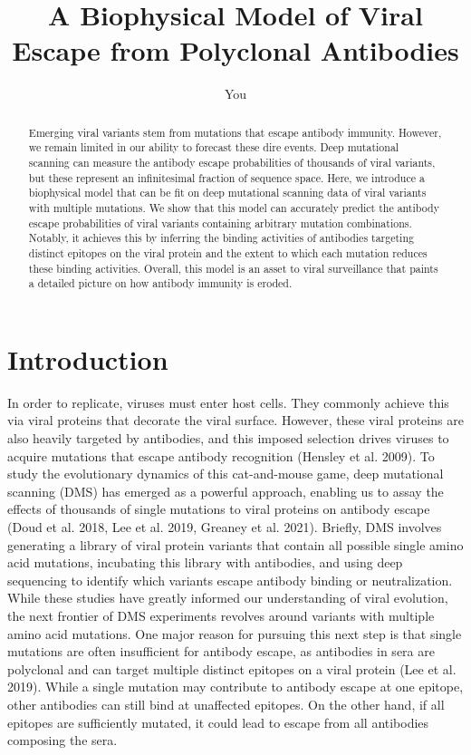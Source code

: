 \documentclass{article}
\title{A Biophysical Model of Viral Escape from Polyclonal Antibodies}
\author{You}
\begin{document}
\maketitle

\begin{abstract}
Emerging viral variants stem from mutations that escape antibody immunity. 
However, we remain limited in our ability to forecast these dire events. 
Deep mutational scanning can measure the antibody escape probabilities of thousands of viral variants, but these represent an infinitesimal fraction of sequence space.
Here, we introduce a biophysical model that can be fit on deep mutational scanning data of viral variants with multiple mutations. 
We show that this model can accurately predict the antibody escape probabilities of viral variants containing arbitrary mutation combinations.
Notably, it achieves this by inferring the binding activities of antibodies targeting distinct epitopes on the viral protein and the extent to which each mutation reduces these binding activities. 
Overall, this model is an asset to viral surveillance that paints a detailed picture on how antibody immunity is eroded.
\end{abstract}

\section*{Introduction}

In order to replicate, viruses must enter host cells. 
They commonly achieve this via viral proteins that decorate the viral surface. 
However, these viral proteins are also heavily targeted by antibodies, and this imposed selection drives viruses to acquire mutations that escape antibody recognition (Hensley et al. 2009). 
To study the evolutionary dynamics of this cat-and-mouse game, deep mutational scanning (DMS) has emerged as a powerful approach, enabling us to assay the effects of thousands of single mutations to viral proteins on antibody escape (Doud et al. 2018, Lee et al. 2019, Greaney et al. 2021). 
Briefly, DMS involves generating a library of viral protein variants that contain all possible single amino acid mutations, incubating this library with antibodies, and using deep sequencing to identify which variants escape antibody binding or neutralization.
While these studies have greatly informed our understanding of viral evolution, the next frontier of DMS experiments revolves around variants with multiple amino acid mutations.
One major reason for pursuing this next step is that single mutations are often insufficient for antibody escape, as antibodies in sera are polyclonal and can target multiple distinct epitopes on a viral protein (Lee et al. 2019). 
While a single mutation may contribute to antibody escape at one epitope, other antibodies can still bind at unaffected epitopes. 
On the other hand, if all epitopes are sufficiently mutated, it could lead to escape from all antibodies composing the sera.
\end{document}
